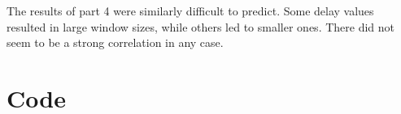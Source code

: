\documentclass{article}
\begin{document}
The results of part 4 were similarly difficult to predict. Some delay values
resulted in large window sizes, while others led to smaller ones. There did
not seem to be a strong correlation in any case.

\section{Code}















\end{document}
